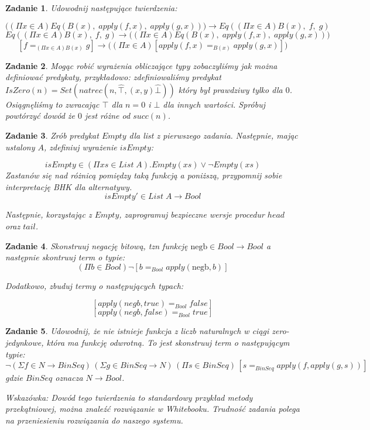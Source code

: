 \documentclass[11pt, a4paper]{article}
\newtheorem{zadanie}{Zadanie}
\begin{document}
\begin{zadanie}
 Udowodnij następujące twierdzenia:

\[
 \Big( (\Pi x \in A) Eq(B(x),\; apply(f,x),\; apply(g,x)) \Big) \to Eq( (\Pi x \in A)B(x),\; f,\; g)
\]
\[
 Eq( (\Pi x \in A)B(x),\; f,\; g) \to \Big( (\Pi x \in A) Eq(B(x),\; apply(f,x),\; apply(g,x)) \Big)
\]
\[
 [f =_{(\Pi x \in A)B(x)} g] \to \Big( (\Pi x \in A) [apply(f,x) =_{B(x)} apply(g,x)] \Big)
\]


\end{zadanie}


\begin{zadanie}
Mogąc robić wyrażenia obliczające typy zobaczyliśmy jak można definiować predykaty, przykładowo: zdefiniowaliśmy
predykat $IsZero(n) = Set(natrec(n, \widehat{\top}, (x,y)\widehat{\bot}))$ który był prawdziwy
tylko dla $0$. Osiągnęliśmy to zwracając $\top$ dla $n=0$ i $\bot$ dla
innych wartości. Spróbuj powtórzyć dowód że $0$ jest różne od $succ(n)$.
\end{zadanie}

\begin{zadanie}
Zrób predykat $Empty$ dla list z pierwszego zadania. Następnie, mając ustalony $A$, zdefiniuj wyrażenie $isEmpty$:

\[
 isEmpty \in (\Pi xs \in List\;A). Empty(xs) \vee \neg Empty(xs)
\]
Zastanów się nad różnicą pomiędzy taką funkcją a poniższą, przypomnij sobie interpretację BHK dla alternatywy.
\[
 isEmpty' \in List\;A \to Bool
\]

Następnie, korzystając z $Empty$, zaprogramuj bezpieczne wersje procedur $head$ oraz $tail$.
\end{zadanie}


\begin{zadanie}
 Skonstruuj negację bitową, tzn funkcję $\mbox{negb} \in Bool \to Bool$ a następnie skontruuj term o typie:
\[
 (\Pi b \in Bool) \neg [b =_{Bool} apply(\mbox{negb},b)]
\]

Dodatkowo, zbuduj termy o następujących typach:

\[
 [apply(negb, true) =_{Bool} false]
\]
\[
 [apply(negb, false) =_{Bool} true]
\]

\end{zadanie}


\begin{zadanie}
 Udowodnij, że nie istnieje funkcja z liczb naturalnych w ciągi zero-jedynkowe, która ma funkcję odwrotną.
To jest skonstruuj
 term o następującym typie:
\[
 \neg (\Sigma f \in N \to BinSeq)\, (\Sigma g \in BinSeq \to N)\,
(\Pi s \in BinSeq)\,[ s =_{BinSeq} apply(f, apply(g, s)) ]
\]
gdzie $BinSeq$ oznacza $N \to Bool$.

Wskazówka: Dowód tego twierdzenia to standardowy przykład metody przekątniowej, można znaleźć rozwiązanie w Whitebooku.
Trudność zadania polega na przeniesieniu rozwiązania do naszego systemu.
\end{zadanie}
\end{document}
